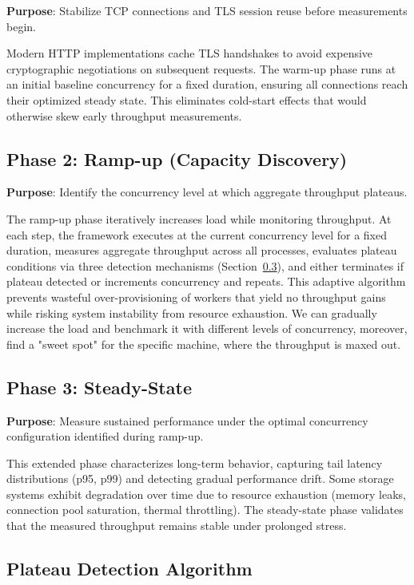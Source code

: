 \textbf{Purpose}: Stabilize TCP connections and TLS session reuse before measurements begin.

Modern HTTP implementations cache TLS handshakes to avoid expensive cryptographic negotiations on subsequent requests. The warm-up phase runs at an initial baseline concurrency for a fixed duration, ensuring all connections reach their optimized steady state. This eliminates cold-start effects that would otherwise skew early throughput measurements.

\subsection{Phase 2: Ramp-up (Capacity Discovery)}

\textbf{Purpose}: Identify the concurrency level at which aggregate throughput plateaus.

The ramp-up phase iteratively increases load while monitoring throughput. At each step, the framework executes at the current concurrency level for a fixed duration, measures aggregate throughput across all processes, evaluates plateau conditions via three detection mechanisms (Section~\ref{sec:plateau}), and either terminates if plateau detected or increments concurrency and repeats. This adaptive algorithm prevents wasteful over-provisioning of workers that yield no throughput gains while risking system instability from resource exhaustion. We can gradually increase the load and benchmark it with different levels of concurrency, moreover, find a "sweet spot" for the specific machine, where the throughput is maxed out.

\subsection{Phase 3: Steady-State}

\textbf{Purpose}: Measure sustained performance under the optimal concurrency configuration identified during ramp-up.

This extended phase characterizes long-term behavior, capturing tail latency distributions (p95, p99) and detecting gradual performance drift. Some storage systems exhibit degradation over time due to resource exhaustion (memory leaks, connection pool saturation, thermal throttling). The steady-state phase validates that the measured throughput remains stable under prolonged stress.

\subsection{Plateau Detection Algorithm}\label{sec:plateau}

